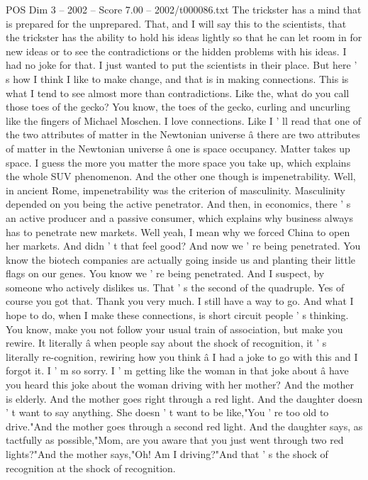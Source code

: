 \begin{textsample}{POS Dim 3 – 2002 – Score 7.00 – 2002/t000086.txt}
The trickster has a mind that is prepared for the unprepared.
That, and I will say this to the scientists, that the trickster has the ability to hold his ideas lightly so that he can let room in for new ideas or to see the contradictions or the hidden problems with his ideas.
I had no joke for that.
I just wanted to put the scientists in their place.
But here ' s how I think I like to make change, and that is in making connections.
This is what I tend to see almost more than contradictions.
Like the, what do you call those toes of the gecko?
You know, the toes of the gecko, curling and uncurling like the fingers of Michael Moschen.
I love connections.
Like I ' ll read that one of the two attributes of matter in the Newtonian universe â there are two attributes of matter in the Newtonian universe â one is space occupancy.
Matter takes up space.
I guess the more you matter the more space you take up, which explains the whole SUV phenomenon.
And the other one though is impenetrability.
Well, in ancient Rome, impenetrability was the criterion of masculinity.
Masculinity depended on you being the active penetrator.
And then, in economics, there ' s an active producer and a passive consumer, which explains why business always has to penetrate new markets.
Well yeah, I mean why we forced China to open her markets.
And didn ' t that feel good?
And now we ' re being penetrated.
You know the biotech companies are actually going inside us and planting their little flags on our genes.
You know we ' re being penetrated.
And I suspect, by someone who actively dislikes us.
That ' s the second of the quadruple.
Yes of course you got that.
Thank you very much.
I still have a way to go.
And what I hope to do, when I make these connections, is short circuit people ' s thinking.
You know, make you not follow your usual train of association, but make you rewire.
It literally â when people say about the shock of recognition, it ' s literally re-cognition, rewiring how you think â I had a joke to go with this and I forgot it.
I ' m so sorry.
I ' m getting like the woman in that joke about â have you heard this joke about the woman driving with her mother?
And the mother is elderly.
And the mother goes right through a red light.
And the daughter doesn ' t want to say anything.
She doesn ' t want to be like,"You ' re too old to drive."And the mother goes through a second red light.
And the daughter says, as tactfully as possible,"Mom, are you aware that you just went through two red lights?"And the mother says,"Oh!
Am I driving?"And that ' s the shock of recognition at the shock of recognition.

\end{textsample}

